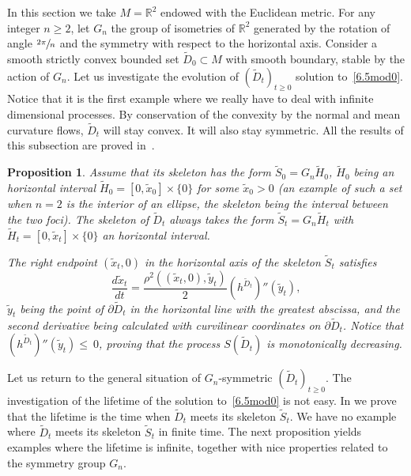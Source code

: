 \documentclass[JEP,XML,SOM,Unicode,NoFloatCountersInSection,published]{cedram}
\theoremstyle{plain}
\newtheorem{prop}[thm]{Proposition}
\theoremstyle{definition}
\newcommand{\RR}{{\mathbb R}}
\let\di\displaystyle
\let\f\frac
\let\wi\widetilde
\begin{document}
In this section we take $M=\RR^2$ endowed with the Euclidean metric.
For any integer $n\ge 2$, let $G_n$ the group of isometries of $\RR^2$ generated by the rotation of angle $\di \sfrac{2\pi}n$ and the symmetry with respect to the horizontal axis.
Consider a smooth strictly convex bounded set $\wi D_0\subset M$ with smooth boundary, stable by the action of $G_n$.
Let us investigate the evolution of $(\wi D_t)_{t\ge0}$ solution to~\eqref{6.5mod0}. Notice that it is the first example where we really have to deal with infinite dimensional processes.
By conservation of the convexity by the normal and mean curvature flows, $\wi D_t$ will stay convex. It will also stay symmetric. All the results of this subsection are proved in~\cite{ACM:21}.
\begin{prop}
\label{P5.4.1}
Assume that its skeleton has the form $\wi S_0=G_n\wi H_0$, $\wi H_0$ being an horizontal interval $\wi H_0=[0,\wi x_0]\times \{0\}$ for some $\wi x_0>0$ (an example of such a set when $n=2$ is the interior of an ellipse, the skeleton being the interval between the two foci).
The skeleton of $\wi D_t$ always takes the form $\wi S_t=G_n\wi H_t$ with $\wi H_t=[0,\wi x_t]\times\{0\}$ an horizontal interval.

The right endpoint $(\wi x_t,0)$ in the horizontal axis of the skeleton $\wi S_t$ satisfies\vspace*{-3pt}\enlargethispage{\baselineskip}
\begin{equation}
\f{d\wi x_t}{dt}=\f{\rho^2((\wi x_t,0),\wi y_t)}2(h^{\wi D_t})''(\wi y_t),
\end{equation}
$\wi y_t$ being the point of $ \partial \wi D_t$ in the horizontal line with the greatest abscissa, and the second derivative being calculated with curvilinear coordinates on $\partial \wi D_t$. Notice that $(h^{\wi D_t})''(\tilde y_t)\le~0$, proving that the process $S(\wi D_t)$ is monotonically decreasing.
\end{prop}
Let us return to the general situation of $G_n$-symmetric $(\wi D_t)_{t\ge0}$.
The investigation of the lifetime of the solution to~\eqref{6.5mod0} is not easy. In \cite{ACM:21} we prove that the lifetime is the time when $\wi D_t$ meets its skeleton $\wi S_t$.
We have no example where $\tilde D_t$ meets its skeleton $\tilde S_t$ in finite time. The next proposition yields examples where the lifetime is infinite, together with nice properties related to the symmetry group $G_n$.
\end{document}

